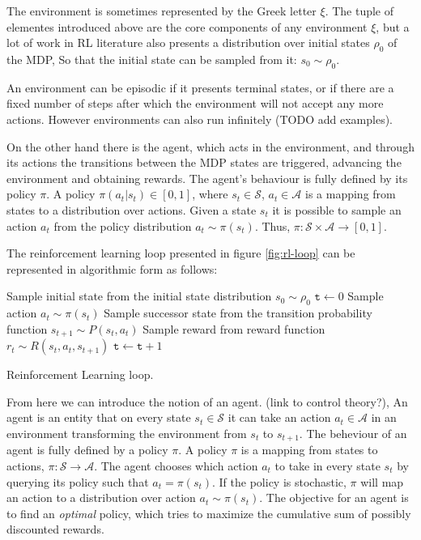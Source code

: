 \documentclass{../main.tex}{subfiles}
\newcommand{\var}{\texttt}
\begin{document}
The environment is sometimes represented by the Greek letter $\xi$. The tuple of elementes introduced above are the core components of any environment $\xi$, but a lot of work in RL literature also presents a distribution over initial states $\rho_0$ of the MDP, So that the initial state can be sampled from it: $s_0 \sim \rho_0$.

An environment can be episodic if it presents terminal states, or if there are a fixed number of steps after which the environment will not accept any more actions. However environments can also run infinitely (TODO add examples).

On the other hand there is the agent, which acts in the environment, and through its actions the transitions between the MDP states are triggered, advancing the environment and obtaining rewards. The agent's behaviour is fully defined by its policy $\pi$. A policy $\pi(a_t | s_t) \in [0,1]$, where $s_t \in \mathcal{S}$, $a_t \in \mathcal{A}$ is a mapping from states to a distribution over actions. Given a state $s_t$ it is possible to sample an action $a_t$ from the policy distribution $a_t \sim \pi(s_t)$. Thus, $\pi: \mathcal{S} \times \mathcal{A} \to [0,1]$.

The reinforcement learning loop presented in figure \ref{fig:rl-loop} can be represented in algorithmic form as follows:
\begin{algorithm}
Sample initial state from the initial state distribution $s_0 \sim \rho_0$ \;
$\var{t} \leftarrow 0$ \;
 {
    Sample action $a_t \sim \pi(s_t)$\;
    Sample successor state from the transition probability function $ s_{t+1} \sim P(s_t, a_t)$ \;
    Sample reward from reward function $r_t \sim R(s_t, a_t, s_{t+1})$ \;
    $\var{t} \leftarrow \var{t} + 1$ \;
}
\caption{Reinforcement Learning loop.}
\end{algorithm}

From here we can introduce the notion of an agent. (link to control theory?), An agent is an entity that on every state $s_t \in \mathcal{S}$ it can take an action $a_t \in \mathcal{A}$ in an environment transforming the environment from $s_t$ to $s_{t+1}$. The beheviour of an agent is fully defined by a policy $\pi$. A policy $\pi$ is a mapping from states to actions, $\pi: \mathcal{S} \to \mathcal{A}$. The agent chooses which action $a_t$ to take in every state $s_t$ by querying its policy such that $a_t = \pi(s_t)$. If the policy is stochastic, $\pi$ will map an action to a distribution over action $a_t \sim \pi(s_t)$. The objective for an agent is to find an \textit{optimal} policy, which tries to maximize the cumulative sum of possibly discounted rewards.
\end{document}
